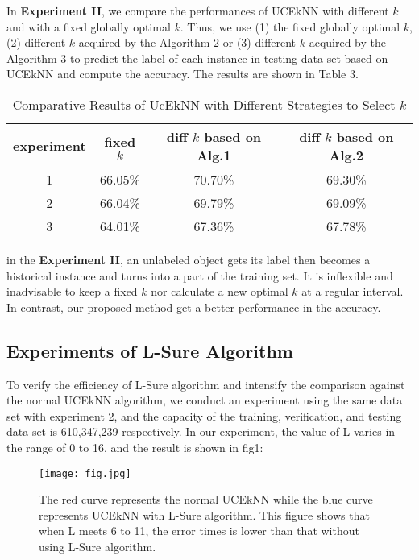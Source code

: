 \documentclass[runningheads]{llncs}
\begin{document}
In \textbf{Experiment II}, we compare the performances of UCEkNN with different $k$ and with a fixed globally optimal $k$. Thus, we use (1) the fixed globally optimal $k$, (2) different $k$ acquired by the Algorithm 2 or (3) different $k$ acquired by the Algorithm 3 to predict the label of each instance in testing data set based on UCEkNN and compute the accuracy. The results are shown in Table 3.
\begin{table}
\begin{center}
\caption{Comparative Results of UcEkNN with Different Strategies to Select $k$}\label{tab1}
\begin{tabular}{|c|c|c|c|}
\hline
experiment &  fixed $k$ & diff $k$ based on Alg.1 & diff $k$ based on Alg.2\\
\hline
1 & 66.05\% & 70.70\%& 69.30\%\\
2 & 66.04\% & 69.79\%& 69.09\% \\
3 & 64.01\% & 67.36\%& 67.78\%\\
\hline
\end{tabular}    
\end{center}
\end{table}


in the \textbf{Experiment II}, an unlabeled object gets its label then becomes a historical instance and turns into a part of the training set. It is inflexible and inadvisable to keep a fixed $k$ nor calculate a new optimal $k$ at a regular interval. In contrast, our proposed method get a better performance in the accuracy.

\subsection{Experiments of L-Sure Algorithm}
To verify the efficiency of L-Sure algorithm and intensify the comparison against the normal UCEkNN algorithm, we conduct an experiment using the same data set with experiment 2,    and the capacity of the training, verification, and testing data set is  610,347,239 respectively. In our experiment, the value of L varies in the range of 0 to 16, and the result is shown in  \figurename{fig1}:

\begin{figure}
\texttt{[image: fig.jpg]}
\caption{The red curve represents the normal UCEkNN while the blue curve represents UCEkNN with L-Sure algorithm. This figure shows that when L meets 6 to 11, the error times is lower than that without using L-Sure algorithm.} 
\label{fig1}
\end{figure}
\end{document}
